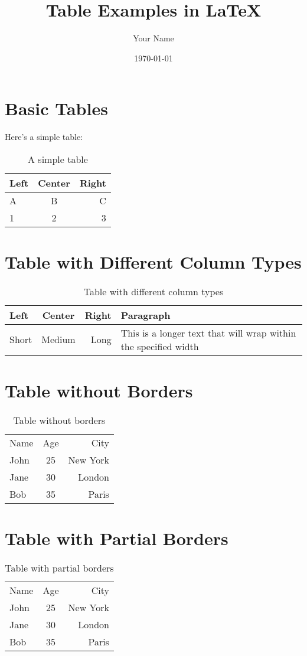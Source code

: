 \documentclass{article}
\title{Table Examples in LaTeX}
\author{Your Name}
\date{\today}
\begin{document}
\maketitle

\section{Basic Tables}
Here's a simple table:

\begin{table}[h]
\centering
\begin{tabular}{|l|c|r|}
\hline
Left & Center & Right \\
\hline
A & B & C \\
1 & 2 & 3 \\
\hline
\end{tabular}
\caption{A simple table}
\label{tab:simple}
\end{table}

\section{Table with Different Column Types}
\begin{table}[h]
\centering
\begin{tabular}{|l|c|r|p{3cm}|}
\hline
Left & Center & Right & Paragraph \\
\hline
Short & Medium & Long & This is a longer text that will wrap within the specified width \\
\hline
\end{tabular}
\caption{Table with different column types}
\label{tab:types}
\end{table}

\section{Table without Borders}
\begin{table}[h]
\centering
\begin{tabular}{l c r}
Name & Age & City \\
John & 25 & New York \\
Jane & 30 & London \\
Bob & 35 & Paris \\
\end{tabular}
\caption{Table without borders}
\label{tab:noborders}
\end{table}

\section{Table with Partial Borders}
\begin{table}[h]
\centering
\begin{tabular}{l|c|r}
\hline
Name & Age & City \\
\cline{1-2}
John & 25 & New York \\
Jane & 30 & London \\
\hline
Bob & 35 & Paris \\
\hline
\end{tabular}
\caption{Table with partial borders}
\label{tab:partial}
\end{table}
\end{document}
